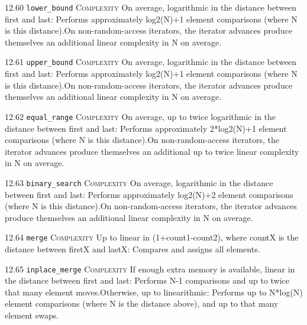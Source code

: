 \noindent\textcolor{corange}{12.60 \texttt{lower\_bound}} \textsc{Complexity} On average, logarithmic in the distance between first and last: Performs approximately log2(N)+1 element comparisons (where N is this distance).On non-random-access iterators, the iterator advances produce themselves an additional linear complexity in N on average. \vspace{0.5em}

\noindent\textcolor{corange}{12.61 \texttt{upper\_bound}} \textsc{Complexity} On average, logarithmic in the distance between first and last: Performs approximately log2(N)+1 element comparisons (where N is this distance).On non-random-access iterators, the iterator advances produce themselves an additional linear complexity in N on average. \vspace{0.5em}

\noindent\textcolor{corange}{12.62 \texttt{equal\_range}} \textsc{Complexity} On average, up to twice logarithmic in the distance between first and last: Performs approximately 2*log2(N)+1 element comparisons (where N is this distance).On non-random-access iterators, the iterator advances produce themselves an additional up to twice linear complexity in N on average. \vspace{0.5em}

\noindent\textcolor{corange}{12.63 \texttt{binary\_search}} \textsc{Complexity} On average, logarithmic in the distance between first and last: Performs approximately log2(N)+2 element comparisons (where N is this distance).On non-random-access iterators, the iterator advances produce themselves an additional linear complexity in N on average. \vspace{0.5em}

\noindent\textcolor{corange}{12.64 \texttt{merge}} \textsc{Complexity} Up to linear in (1+count1-count2), where countX is the distance between firstX and lastX: Compares and assigns all elements. \vspace{0.5em}

\noindent\textcolor{cred}{12.65 \texttt{inplace\_merge}} \textsc{Complexity} If enough extra memory is available, linear in the distance between first and last: Performs N-1 comparisons and up to twice that many element moves.Otherwise, up to linearithmic: Performs up to N*log(N) element comparisons (where N is the distance above), and up to that many element swaps. \vspace{0.5em}

